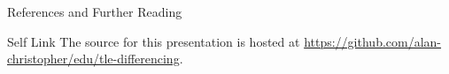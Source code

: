 \documentclass[pdf]{beamer}
\makeatletter
\def\beamer@writeslidentry@miniframesoff{%
  \expandafter\beamer@ifempty\expandafter{\beamer@framestartpage}{}%
  {%
    \clearpage\beamer@notesactions%
  }
}
\newcommand*{\miniframesoff}{\let\beamer@writeslidentry=\beamer@writeslidentry@miniframesoff}
\makeatother
\begin{document}
\miniframesoff
\section*{}
\begin{frame}{References and Further Reading}
  \AtNextBibliography{\tiny}
  \nocite{*}
  \printbibliography
\end{frame}

\begin{frame}{Self Link}
  The source for this presentation is hosted at
\url{https://github.com/alan-christopher/edu/tle-differencing}.

\end{frame}
\end{document}
